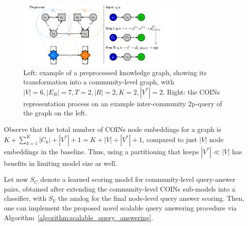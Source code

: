 \begin{figure}[H]
    \centering
    \includegraphics[width=0.75\textwidth]{figures/coins/coins.pdf}
    \caption[Example of a preprocessed knowledge graph and the COINs representation process on an example query.]{Left: example of a preprocessed knowledge graph, showing its transformation into a community-level graph, with $|V|=6, |E_R|=7, T=2, |R|=2, K=2, |V^*|=2$. Right: the COINs representation process on an example inter-community 2p-query of the graph on the left.}
    \label{fig:community_preprocessing}
\end{figure}

Observe that the total number of COINs node embeddings for a graph is $K + \sum_{k=1}^{K}{|C_k|} + |V^*| + 1 = K + |V| + |V^*| + 1$, compared to just $|V|$ node embeddings in the baseline. Thus, using a partitioning that keeps $|V^*| \ll |V|$ has benefits in limiting model size as well. 

Let now $S_C$ denote a learned scoring model for community-level query-answer pairs, obtained after extending the community-level COINs sub-models into a classifier, with $S_V$ the analog for the final node-level query answer scoring. Then, one can implement the proposed novel scalable query answering procedure via Algorithm~\ref{algorithm:scalable_query_answering}. %

